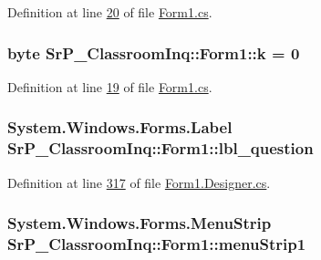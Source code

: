 \-Definition at line \hyperlink{_form1_8cs_source_l00020}{20} of file \hyperlink{_form1_8cs_source}{\-Form1.\-cs}.

\hypertarget{class_sr_p___classroom_inq_1_1_form1_afac3413b9df22d1eb1e9c466ef49d5c5}{
\subsubsection[{k}]{\setlength{\rightskip}{0pt plus 5cm}byte {\bf \-Sr\-P\-\_\-\-Classroom\-Inq\-::\-Form1\-::k} = 0}}
\label{class_sr_p___classroom_inq_1_1_form1_afac3413b9df22d1eb1e9c466ef49d5c5}


\-Definition at line \hyperlink{_form1_8cs_source_l00019}{19} of file \hyperlink{_form1_8cs_source}{\-Form1.\-cs}.

\hypertarget{class_sr_p___classroom_inq_1_1_form1_a885c7aceb5d883641c46d08d97692f4c}{
\subsubsection[{lbl\-\_\-question}]{\setlength{\rightskip}{0pt plus 5cm}\-System.\-Windows.\-Forms.\-Label {\bf \-Sr\-P\-\_\-\-Classroom\-Inq\-::\-Form1\-::lbl\-\_\-question}}}
\label{class_sr_p___classroom_inq_1_1_form1_a885c7aceb5d883641c46d08d97692f4c}


\-Definition at line \hyperlink{_form1_8_designer_8cs_source_l00317}{317} of file \hyperlink{_form1_8_designer_8cs_source}{\-Form1.\-Designer.\-cs}.

\hypertarget{class_sr_p___classroom_inq_1_1_form1_a96c0a67f69db0cb7d91c00ec20c57863}{
\subsubsection[{menu\-Strip1}]{\setlength{\rightskip}{0pt plus 5cm}\-System.\-Windows.\-Forms.\-Menu\-Strip {\bf \-Sr\-P\-\_\-\-Classroom\-Inq\-::\-Form1\-::menu\-Strip1}}}
\label{class_sr_p___classroom_inq_1_1_form1_a96c0a67f69db0cb7d91c00ec20c57863}



